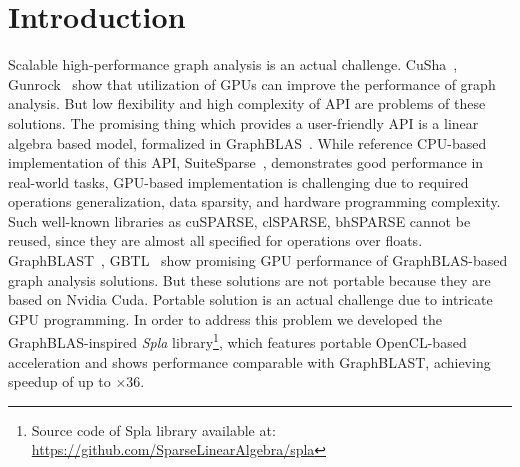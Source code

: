 \section{Introduction}


Scalable high-performance graph analysis is an actual challenge.
CuSha~\cite{10.1145/2600212.2600227}, Gunrock~\cite{7967137} show that utilization of GPUs can improve the performance of graph analysis. But low flexibility and high complexity of API are problems of these solutions. The promising thing which provides a user-friendly API is a linear algebra based model, formalized in GraphBLAS~\cite{7761646}. While reference CPU-based implementation of this API, SuiteSparse~\cite{10.1145/3322125}, demonstrates good performance in real-world tasks, GPU-based implementation is challenging due to required operations generalization, data sparsity, and hardware programming complexity. Such well-known libraries as cuSPARSE, clSPARSE, bhSPARSE cannot be reused, since they are almost all specified for operations over floats. GraphBLAST~\cite{yang2019graphblast}, GBTL~\cite{7529957} show promising GPU performance of GraphBLAS-based graph analysis solutions. But these solutions are not portable because they are based on Nvidia Cuda. Portable solution is an actual challenge due to intricate GPU programming. In order to address this problem we developed the GraphBLAS-inspired \textit{Spla} library\footnote{Source code of Spla library available at: \url{https://github.com/SparseLinearAlgebra/spla}}, which features portable OpenCL-based acceleration and shows performance comparable with GraphBLAST, achieving speedup of up to $\times36$.